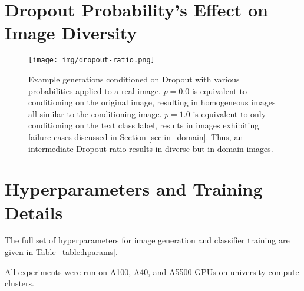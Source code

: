 \appendix

\clearpage
\section{Dropout Probability's Effect on Image Diversity} \label{app:dropout}
\begin{figure}[ht!]
    \centering
    \hspace*{-0.5cm}
    \texttt{[image: img/dropout-ratio.png]}
    \caption{Example generations conditioned on Dropout with various probabilities applied to a real image. $p=0.0$ is equivalent to conditioning on the original image, resulting in homogeneous images all similar to the conditioning image. $p=1.0$ is equivalent to only conditioning on the text class label, results in images exhibiting failure cases discussed in Section \ref{sec:in_domain}. Thus, an intermediate Dropout ratio results in diverse but in-domain images.} 
    \label{fig:dropout}
\end{figure}



\section{Hyperparameters and Training Details}\label{app:hyperparams}

The full set of hyperparameters for image generation and classifier training are given in Table~\ref{table:hparams}.

All experiments were run on A100, A40, and A5500 GPUs on university compute clusters. 

